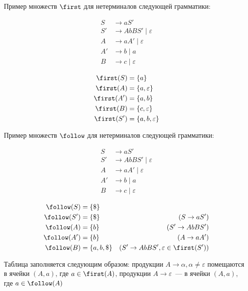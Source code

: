 Пример множеств $\first$ для нетерминалов следующей грамматики: 

\begin{multicols}{2}
\begin{align*}
  S  &\to a S' \\ 
  S' &\to A b B S' \mid \varepsilon \\ 
  A  &\to a A' \mid \varepsilon \\ 
  A' &\to b \mid a \\ 
  B  &\to c \mid \varepsilon
\end{align*}

\columnbreak
    
\begin{align*}
  \first(S)  &= \{ a \} \\
  \first(A)  &= \{ a, \varepsilon \} \\ 
  \first(A') &= \{ a, b \} \\
  \first(B)  &= \{ c, \varepsilon \} \\
  \first(S') &= \{ a, b, \varepsilon \}  
\end{align*}
\end{multicols}

Пример множеств $\follow$ для нетерминалов следующей грамматики:

\begin{multicols}{2}
\begin{align*}
  S  &\to a S' \\ 
  S' &\to A b B S' \mid \varepsilon \\ 
  A  &\to a A' \mid \varepsilon \\ 
  A' &\to b \mid a \\ 
  B  &\to c \mid \varepsilon
\end{align*}

\columnbreak
    
\begin{align*}
  \follow(S)  &= \{ \$ \} & \\
  \follow(S') &= \{ \$ \} &(S \to a S')\\
  \follow(A)  &= \{ b \}  &(S' \to A b B S') \\ 
  \follow(A') &= \{ b \}  &(A \to a A')\\
  \follow(B)  &= \{ a, b, \$ \} &(S' \to A b B S', \varepsilon \in \first(S'))
\end{align*}  
\end{multicols}

Таблица заполняется следующим образом: продукции $A \to \alpha, \alpha \neq \varepsilon$ помещаются в ячейки $(A, a)$, где $a \in \first(A)$, продукции $A \to \varepsilon$~--- в ячейки $(A, a)$, где $a \in \follow(A)$

